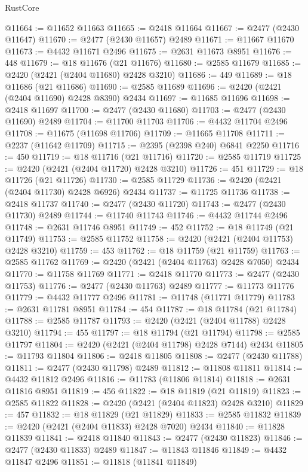 \begin{lexlean}{RustCore}
\begin{coremodule}
@11664 := @11652 @11663
@11665 := @2418 @11664
@11667 := @2477 (@2430 @11647)
@11670 := @2477 (@2430 @11657) @2489
@11671 := @11667 @11670
@11673 := @4432 @11671 @2496
@11675 := @2631 @11673 @8951
@11676 := 448
@11679 := @18 @11676 (@21 @11676)
@11680 := @2585 @11679
@11685 := @2420 (@2421 (@2404 @11680) @2428 @3210)
@11686 := 449
@11689 := @18 @11686 (@21 @11686)
@11690 := @2585 @11689
@11696 := @2420 (@2421 (@2404 @11690) @2428 @8390) @2434
@11697 := @11685 @11696
@11698 := @2418 @11697
@11700 := @2477 (@2430 @11680)
@11703 := @2477 (@2430 @11690) @2489
@11704 := @11700 @11703
@11706 := @4432 @11704 @2496
@11708 := @11675 (@11698 @11706)
@11709 := @11665 @11708
@11711 := @2237 (@11642 @11709)
@11715 := @2395 (@2398 @240) @6841 @2250
@11716 := 450
@11719 := @18 @11716 (@21 @11716)
@11720 := @2585 @11719
@11725 := @2420 (@2421 (@2404 @11720) @2428 @3210)
@11726 := 451
@11729 := @18 @11726 (@21 @11726)
@11730 := @2585 @11729
@11736 := @2420 (@2421 (@2404 @11730) @2428 @6926) @2434
@11737 := @11725 @11736
@11738 := @2418 @11737
@11740 := @2477 (@2430 @11720)
@11743 := @2477 (@2430 @11730) @2489
@11744 := @11740 @11743
@11746 := @4432 @11744 @2496
@11748 := @2631 @11746 @8951
@11749 := 452
@11752 := @18 @11749 (@21 @11749)
@11753 := @2585 @11752
@11758 := @2420 (@2421 (@2404 @11753) @2428 @3210)
@11759 := 453
@11762 := @18 @11759 (@21 @11759)
@11763 := @2585 @11762
@11769 := @2420 (@2421 (@2404 @11763) @2428 @7050) @2434
@11770 := @11758 @11769
@11771 := @2418 @11770
@11773 := @2477 (@2430 @11753)
@11776 := @2477 (@2430 @11763) @2489
@11777 := @11773 @11776
@11779 := @4432 @11777 @2496
@11781 := @11748 (@11771 @11779)
@11783 := @2631 @11781 @8951
@11784 := 454
@11787 := @18 @11784 (@21 @11784)
@11788 := @2585 @11787
@11793 := @2420 (@2421 (@2404 @11788) @2428 @3210)
@11794 := 455
@11797 := @18 @11794 (@21 @11794)
@11798 := @2585 @11797
@11804 := @2420 (@2421 (@2404 @11798) @2428 @7144) @2434
@11805 := @11793 @11804
@11806 := @2418 @11805
@11808 := @2477 (@2430 @11788)
@11811 := @2477 (@2430 @11798) @2489
@11812 := @11808 @11811
@11814 := @4432 @11812 @2496
@11816 := @11783 (@11806 @11814)
@11818 := @2631 @11816 @8951
@11819 := 456
@11822 := @18 @11819 (@21 @11819)
@11823 := @2585 @11822
@11828 := @2420 (@2421 (@2404 @11823) @2428 @3210)
@11829 := 457
@11832 := @18 @11829 (@21 @11829)
@11833 := @2585 @11832
@11839 := @2420 (@2421 (@2404 @11833) @2428 @7020) @2434
@11840 := @11828 @11839
@11841 := @2418 @11840
@11843 := @2477 (@2430 @11823)
@11846 := @2477 (@2430 @11833) @2489
@11847 := @11843 @11846
@11849 := @4432 @11847 @2496
@11851 := @11818 (@11841 @11849)

\end{coremodule}
\end{lexlean}
